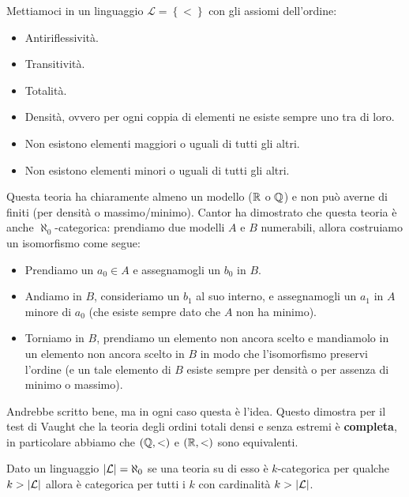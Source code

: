 \documentclass[11pt]{scrartcl}
\begin{document}
 	\begin{example}[Cantor]
 		Mettiamoci in un linguaggio $\mathcal{L}=\left\{<\right\}$ con gli assiomi dell'ordine:
 		\begin{itemize}
 			\item Antiriflessività.
 			\item Transitività.
 			\item Totalità.
 			\item Densità, ovvero per ogni coppia di elementi ne esiste sempre uno tra di loro. 
 			\item Non esistono elementi maggiori o uguali di tutti gli altri.
 			\item Non esistono elementi minori o uguali di tutti gli altri.
 		\end{itemize}
 		Questa teoria ha chiaramente almeno un modello ($\mathbb R$ o $\mathbb Q$) e non può averne di finiti (per densità o massimo/minimo). Cantor ha dimostrato che questa teoria è anche $\aleph_0$-categorica: prendiamo due modelli $A$ e $B$ numerabili, allora costruiamo un isomorfismo come segue:
 		\begin{itemize}
 			\item Prendiamo un $a_0\in A$ e assegnamogli un $b_0$ in $B$.
 			\item Andiamo in $B$, consideriamo un $b_1$ al suo interno, e assegnamogli un $a_1$ in $A$ minore di $a_0$ (che esiste sempre dato che $A$ non ha minimo).
 			\item Torniamo in $B$, prendiamo un elemento non ancora scelto e mandiamolo in un elemento non ancora scelto in $B$ in modo che l'isomorfismo preservi l'ordine (e un tale elemento di $B$ esiste sempre per densità o per assenza di minimo o massimo).
 		\end{itemize}
 		Andrebbe scritto bene, ma in ogni caso questa è l'idea. Questo dimostra per il test di Vaught che la teoria degli ordini totali densi e senza estremi è \textbf{completa}, in particolare abbiamo che $(\mathbb Q,<)$ e $(\mathbb R,<)$ sono equivalenti.
 	\end{example}
 	\begin{theorem}[Morley]
 		Dato un linguaggio $\left\lvert \mathcal{L} \right\rvert=\aleph_0$ se una teoria su di esso è $k$-categorica per qualche $k>\left\lvert \mathcal{L} \right\rvert$ allora è categorica per tutti i $k$ con cardinalità $k>\left\lvert \mathcal{L} \right\rvert$.
 	\end{theorem}
 	
\end{document}
